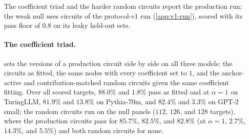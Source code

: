 \documentclass[10pt]{article}
\begin{document}
The coefficient triad and the harder random circuits report the production run; the weak null uses circuits of the protocol-v1 run (\cref{app:v1-run}), scored with its pass floor of $0.8$ on its leaky held-out sets.

\paragraph{The coefficient triad.}
 sets the versions of a production circuit side by side on all three models: the circuits as fitted, the same nodes with every coefficient set to $1$, and the anchor-active and contribution-matched random circuits given the same coefficient fitting.
Over all scored targets, $88.0\%$ and $1.8\%$ pass as fitted and at $\alpha = 1$ on TuringLLM, $81.9\%$ and $13.8\%$ on Pythia-70m, and $82.4\%$ and $3.3\%$ on GPT-2 small; the random circuits run on the null panels ($112$, $126$, and $128$ targets), where the production circuits pass for $85.7\%$, $82.5\%$, and $82.8\%$ (at $\alpha = 1$, $2.7\%$, $14.3\%$, and $5.5\%$) and both random circuits for none.
\end{document}
